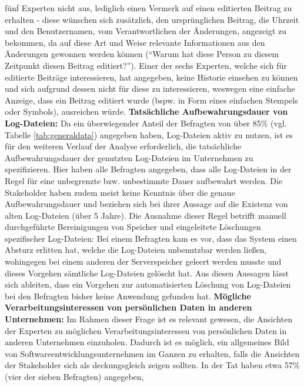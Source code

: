 fünf Experten nicht aus, lediglich einen Vermerk auf einen editierten Beitrag zu erhalten - diese wünschen sich zusätzlich, den ursprünglichen Beitrag, die Uhrzeit und den Benutzernamen, vom Verantwortlichen der Änderungen, angezeigt zu bekommen, da auf diese Art und Weise relevante Informationen aus den Änderungen gewonnen werden können (\enquote{Warum hat diese Person zu diesem Zeitpunkt diesen Beitrag
editiert?}). \newline Einer der sechs Experten, welche sich für editierte Beiträge interessieren, hat angegeben, keine Historie einsehen zu können und sich aufgrund dessen nicht für diese zu interessieren, weswegen eine einfache Anzeige, dass ein Beitrag editiert wurde (bspw. in Form eines einfachen Stempels oder Symbols), ausreichen würde. \newline \newline
\textbf{Tatsächliche Aufbewahrungsdauer von Log-Dateien:}\newline \label{logs}
Da ein überwiegender Anteil der Befragten von über 85\% (vgl. Tabelle \ref{tab:generaldata}) angegeben haben, Log-Dateien aktiv zu nutzen, ist es für den weiteren Verlauf der Analyse erforderlich, die tatsächliche Aufbewahrungsdauer der genutzten Log-Dateien 
im Unternehmen zu spezifizieren. Hier haben alle Befragten angegeben, dass alle Log-Dateien in der Regel für eine unbegrenzte bzw. unbestimmte Dauer aufbewahrt werden. Die Stakeholder haben zudem meist keine Kenntnis über die genaue Aufbewahrungsdauer und 
beziehen sich bei ihrer Aussage auf die Existenz von alten Log-Dateien (über 5 Jahre). \newline Die Ausnahme dieser Regel betrifft manuell durchgeführte Bereinigungen von Speicher und eingeleitete Löschungen spezifischer Log-Dateien: Bei einem Befragten kam es vor,
dass das System einen Absturz erlitten hat, welche die Log-Dateien unbenutzbar werden ließen, wohingegen bei einem anderen der Serverspeicher geleert werden musste und dieses Vorgehen sämtliche Log-Dateien gelöscht hat. \newline Aus diesen Aussagen lässt sich 
ableiten, dass ein Vorgehen zur automatisierten Löschung von Log-Dateien bei den Befragten bisher keine Anwendung gefunden hat. \newline \newline
\textbf{Mögliche Verarbeitungsinteressen von persönlichen Daten in anderen Unternehmen:} \newline
Im Rahmen dieser Frage ist es relevant gewesen, die Ansichten der Experten zu möglichen Verarbeitungsinteressen von persönlichen Daten in anderen Unternehmen einzuholen. Dadurch ist es möglich, ein allgemeines Bild von Softwareentwicklungsunternehmen im Ganzen zu erhalten, falls die Ansichten der Stakeholder sich als deckungsgleich zeigen sollten. \newline In der Tat haben etwa 57\% (vier der sieben Befragten) angegeben,

